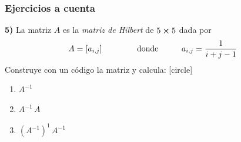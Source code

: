 \begin{frame}
\frametitle{Ejercicios a cuenta}
\textbf{5) } La matriz $A$ es la \emph{matriz de Hilbert} de $5 \cp 5$ dada por
\begin{align*}
A = [a_{i, j}] \hspace{1.5cm} \text{donde} \hspace{1cm} a_{i, j} = \dfrac{1}{i + j -1}
\end{align*}
Construye con un código la matriz y calcula:
[circle]
\begin{enumerate}
\item $A^{-1}$
\item $A^{-1} \, A$
\item $(A^{-1})^{1} \, A^{-1}$
\end{enumerate} 
\end{frame}
